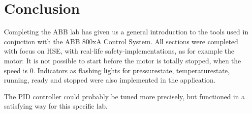 \newpage
\section{Conclusion}

Completing the ABB lab has given us a general introduction to the tools used in conjuction with the ABB 800xA Control System. All sections were completed with focus on HSE, with real-life safety-implementations, as for example the motor: It is not possible to start before the motor is totally stopped, when the speed is 0. Indicators as flashing lights for pressurestate, temperaturestate, running, ready and stopped were also implemented in the application.

The PID controller could probably be tuned more precisely, but functioned in a satisfying way for this specific lab.  